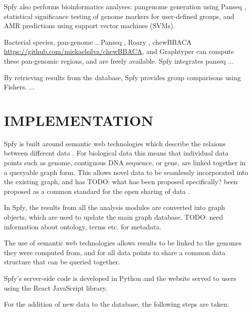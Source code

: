 \documentclass[a4,center,fleqn]{NAR}
\begin{document}
Spfy also performs bioinformatics analyses: pangenome generation using Panseq \cite{laing2010pan}, statistical significance testing of genome markers for user-defined groups, and AMR predictions using support vector machines (SVMs).


Bacterial species, pan-genome ...Panseq \cite{laing2010pan}, Roary \cite{page2015roary}, chewBBACA \url{https://github.com/mickaelsilva/chewBBACA}, and Graphtyper \cite{Eggertsson148403} can compute these pan-genomic regions, and are freely available.
Spfy integrates panseq ...

By retrieving results from the database, Spfy provides group comparisons using Fishers.
...


\section{IMPLEMENTATION}
Spfy is built around semantic web technologies which describe the relaions between different data \cite{berners2001semantic}. For biological data this means that individual data points such as genome, contiguous DNA sequence, or gene, are linked together in a queryable graph form. This allows novel data to be seamlessly incorporated into the existing graph, and has {TODO: what has been proposed specifically?} been proposed as a common standard for the open sharing of data \cite{horrocks2005semantic}.

In Spfy, the results from all the analysis modules are converted into graph objects, which are used to update the main graph database. TODO: need information about ontology, terms etc. for metadata.

The use of semantic web technologies allows results to be linked to the genomes they were computed from, and for all data points to share a common data structure that can be queried together.

Spfy's server-side code is developed in Python and the website served to users using the React JavaScript library.

For the addition of new data to the database, the following steps are taken:
\end{document}
